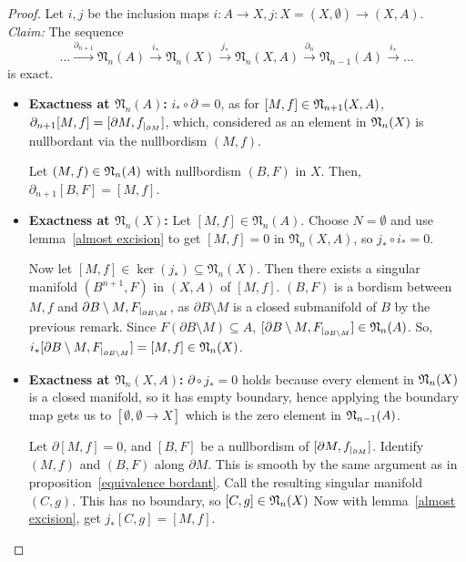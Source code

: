 \documentclass[a4paper,12pt]{article}
\begin{document}
\begin{proof}\cite{dieck}
    Let \(i,j\) be the inclusion maps \(i:A\to X, j:X=(X,\emptyset)\to(X,A)\).\\
    \textit{Claim:} The sequence
    \[\dots\xrightarrow{\partial_{n+1}}\mathfrak{N}_n(A)\xrightarrow{i_\ast}\mathfrak{N}_n(X)\xrightarrow{j_\ast}\mathfrak{N}_n(X,A)\xrightarrow{\partial_n}\mathfrak{N}_{n-1}(A)\xrightarrow{i_\ast}\dots\]
    is exact.
    \begin{itemize}
        \item \textbf{Exactness at \(\mathfrak{N}_n(A)\):}
        \(i_\ast\circ \partial=0\), as for \([M,f]\in\mathfrak{N}_{n+1}(X,A)\), \(\partial_{n+1} [M,f]=[\partial M,f_{|_{\partial M}}]\), which, considered as an element in \(\mathfrak{N}_n(X)\) is nullbordant via the nullbordism \((M,f)\).

        Let \((M,f)\in\mathfrak{N}_n(A)\) with nullbordism \((B,F)\) in \(X\). Then, \(\partial_{n+1}[B,F]=[M,f]\).

        \item \textbf{Exactness at \(\mathfrak{N}_n(X)\):} Let \([M,f]\in\mathfrak{N}_n(A)\). Choose \(N=\emptyset\) and use lemma\ \ref{almost excision} to get \([M,f]=0\) in \(\mathfrak{N}_n(X,A)\), so \(j_\ast\circ i_\ast=0\).
        
        Now let \([M,f]\in\ker(j_\ast)\subseteq \mathfrak{N}_n(X)\). Then there exists a singular manifold \((B^{n+1},F)\) in \((X,A)\) of \([M,f]\). \((B,F)\) is a bordism between \(M,f\) and \(\partial B\setminus M,F_{|_{\partial B\setminus M}}\), as \(\partial B\setminus M\) is a closed submanifold of \(B\) by the previous remark. 
        Since \(F(\partial B\setminus M)\subseteq A\), \([\partial B\setminus M,F_{|_{\partial B\setminus M}}]\in\mathfrak{N}_n(A)\). So, \(i_\ast[\partial B\setminus M,F_{|_{\partial B\setminus M}}]=[M,f]\in\mathfrak{N}_n(X)\).

        \item \textbf{Exactness at \(\mathfrak{N}_n(X,A)\):} \(\partial \circ j_\ast=0\) holds because every element in \(\mathfrak{N}_n(X)\) is a closed manifold, so it has empty boundary, hence applying the boundary map gets us to \([\emptyset,\emptyset\to X]\) which is the zero element in \(\mathfrak{N}_{n-1}(A)\).
        
        Let \(\partial[M,f]=0\), and \([B,F]\) be a nullbordism of \([\partial M, f_{|_{\partial M}}]\). Identify \((M,f)\) and \((B,F)\) along \(\partial M\). This is smooth by the same argument as in proposition\ \ref{equivalence bordant}. Call the resulting singular manifold \((C,g)\). This has no boundary, so \([C,g]\in\mathfrak{N}_n(X)\) Now with lemma\ \ref{almost excision}, get \(j_\ast[C,g]=[M,f]\).
    \end{itemize}
\end{proof}
\end{document}
